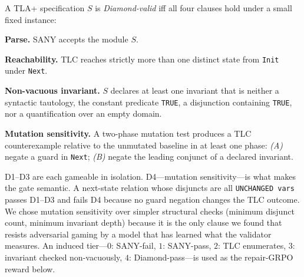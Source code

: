 \documentclass[11pt]{article}
\begin{document}
\begin{tcolorbox}[
  enhanced, breakable,
  colback=cbox, colframe=cline, boxrule=0.5pt,
  arc=2pt, left=8pt, right=8pt, top=4pt, bottom=4pt,
  title=\textbf{Definition (Diamond gate).}, fonttitle=\small,
]
A TLA+ specification $S$ is \emph{Diamond-valid} iff all four clauses
hold under a small fixed instance:
\begin{description}[leftmargin=1.4em, itemsep=1pt]
\item[\textbf{D1.}] \textbf{Parse.} SANY accepts the module $S$.
\item[\textbf{D2.}] \textbf{Reachability.} TLC reaches strictly more
  than one distinct state from \texttt{Init} under \texttt{Next}.
\item[\textbf{D3.}] \textbf{Non-vacuous invariant.} $S$ declares at
  least one invariant that is neither a syntactic tautology, the
  constant predicate \texttt{TRUE}, a disjunction containing
  \texttt{TRUE}, nor a quantification over an empty domain.
\item[\textbf{D4.}] \textbf{Mutation sensitivity.} A two-phase
  mutation test produces a TLC counterexample relative to the
  unmutated baseline in at least one phase: \emph{(A)} negate a
  guard in \texttt{Next}; \emph{(B)} negate the leading conjunct of
  a declared invariant.
\end{description}
\end{tcolorbox}

\noindent D1--D3 are each gameable in isolation. D4---mutation
sensitivity---is what makes the gate semantic. A next-state relation
whose disjuncts are all \texttt{UNCHANGED vars} passes D1--D3 and
fails D4 because no guard negation changes the TLC outcome. We chose
mutation sensitivity over simpler structural checks (minimum disjunct
count, minimum invariant depth) because it is the only clause we
found that resists adversarial gaming by a model that has learned
what the validator measures. An induced tier---$0$: SANY-fail, $1$:
SANY-pass, $2$: TLC enumerates, $3$: invariant checked non-vacuously,
$4$: Diamond-pass---is used as the repair-GRPO reward below.
\end{document}
